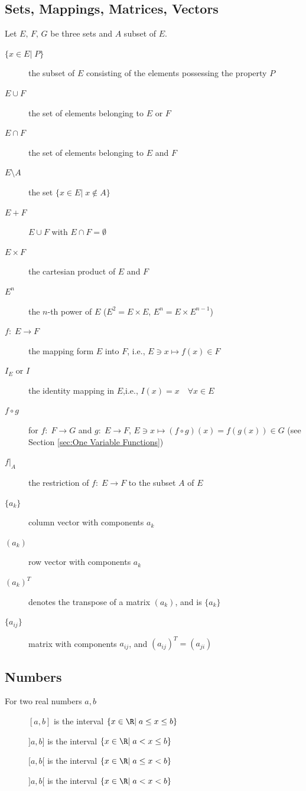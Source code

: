 \documentclass[a4paper,twoside,12pt]{book}
\def\refSec#1{Section \ref{sec:#1}}
\begin{document}
\subsection{Sets, Mappings, Matrices, Vectors}
Let $E,\, F,\, G$ be three sets and $A$ subset of $E$.
\begin{description}
  \item[$\{x\in E|\; P\}$] the subset of $E$ consisting of the elements possessing the property $P$
  \item[$E\cup F$] the set of elements belonging to $E$ or $F$
  \item[$E\cap F$] the set of elements belonging to $E$ and $F$
  \item[$E\setminus A$] the set $\{x\in E|\; x\not\in A\}$
  \item[$E+F$] $E\cup F$ with $E\cap F=\emptyset$
  \item[$E\times F$] the cartesian product of $E$ and $F$
  \item[$E^n$] the $n$-th power of $E$ ($E^2=E\times E$, $E^n=E\times E^{n-1}$)
  \item[$f:\; E\to F$] the mapping form $E$ into $F$, i.e.,
  $E\ni x\mapsto f(x)\in F$
  \item[$I_E$ or $I$] the identity mapping in $E$,i.e., $I(x)=x\quad \forall x\in E$
  \item[$f\circ g$] for $f:\; F\to G$ and $g:\; E\to F$,
  $E\ni x\mapsto (f\circ g)(x)=f(g(x))\in G$ (see \refSec{One Variable Functions})
  \item[$f|_A$] the restriction of $f:\; E\to F$ to the subset $A$ of $E$
  \item[$\{a_k\}$] column vector with components $a_k$
  \item[$(a_k)$] row vector with components $a_k$
  \item[$(a_{k})^T$] denotes the transpose of a matrix $(a_{k})$, and
  is $\{a_{k}\}$
  \item[$\{a_{ij}\}$] matrix with components $a_{ij}$, and $(a_{ij})^T=(a_{ji})$
\end{description}

\subsection{Numbers}
For two real numbers $a,b$
\begin{description}
  \item[\quad]$[a,b]$ is the interval $\{x\in \R|\; a\le x\le b\}$
  \item[\quad]$]a,b]$ is the interval $\{x\in \R|\; a< x\le b\}$
  \item[\quad]$[a,b[$ is the interval $\{x\in \R|\; a\le x< b\}$
  \item[\quad]$]a,b[$ is the interval $\{x\in \R|\; a< x< b\}$
\end{description}
\end{document}
